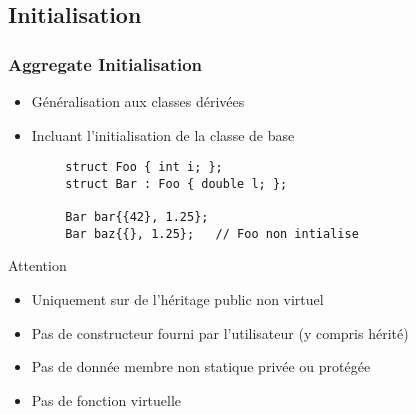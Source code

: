 \documentclass[C++.tex]{subfiles}
\begin{document}
\subsection*{Initialisation}
\begin{frame}[fragile]
	\frametitle{Aggregate Initialisation}
	\begin{itemize}
		\item Généralisation aux classes dérivées
		\item Incluant l'initialisation de la classe de base
	\end{itemize}

	\begin{verbatim}
		struct Foo { int i; };
		struct Bar : Foo { double l; };

		Bar bar{{42}, 1.25};
		Bar baz{{}, 1.25};   // Foo non intialise
	\end{verbatim}

	\begin{alertblock}{Attention}
		\begin{itemize}
			\item Uniquement sur de l'héritage public non virtuel
			\item Pas de constructeur fourni par l'utilisateur (y compris hérité)
			\item Pas de donnée membre non statique privée ou protégée
			\item Pas de fonction virtuelle
		\end{itemize}
	\end{alertblock}



\end{frame}
\end{document}
